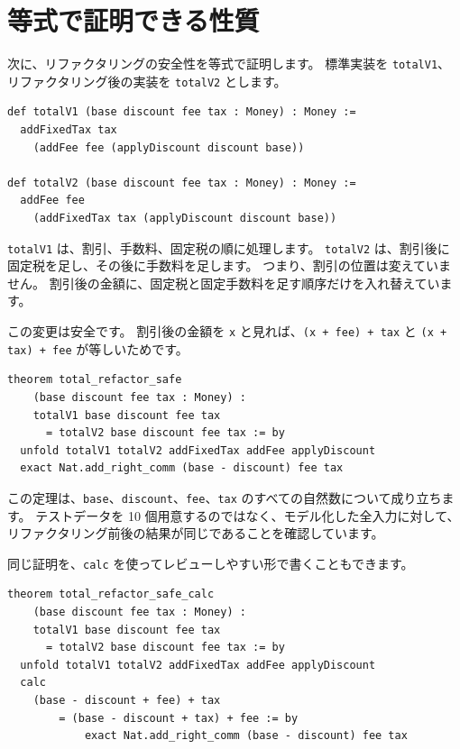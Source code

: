 \section{等式で証明できる性質}

次に、リファクタリングの安全性を等式で証明します。
標準実装を \texttt{totalV1}、リファクタリング後の実装を \texttt{totalV2} とします。

\begin{listing}[htbp]
\begin{verbatim}
def totalV1 (base discount fee tax : Money) : Money :=
  addFixedTax tax
    (addFee fee (applyDiscount discount base))

def totalV2 (base discount fee tax : Money) : Money :=
  addFee fee
    (addFixedTax tax (applyDiscount discount base))
\end{verbatim}
\caption{\texttt{totalV1} と \texttt{totalV2}}
\label{lst:ch26-total-v1-v2}
\end{listing}

\texttt{totalV1} は、割引、手数料、固定税の順に処理します。
\texttt{totalV2} は、割引後に固定税を足し、その後に手数料を足します。
つまり、割引の位置は変えていません。
割引後の金額に、固定税と固定手数料を足す順序だけを入れ替えています。

この変更は安全です。
割引後の金額を \texttt{x} と見れば、\texttt{(x + fee) + tax} と \texttt{(x + tax) + fee} が等しいためです。

\begin{listing}[htbp]
\begin{verbatim}
theorem total_refactor_safe
    (base discount fee tax : Money) :
    totalV1 base discount fee tax
      = totalV2 base discount fee tax := by
  unfold totalV1 totalV2 addFixedTax addFee applyDiscount
  exact Nat.add_right_comm (base - discount) fee tax
\end{verbatim}
\caption{\texttt{total\_refactor\_safe}}
\label{lst:ch26-total-refactor-safe}
\end{listing}

この定理は、\texttt{base}、\texttt{discount}、\texttt{fee}、\texttt{tax} のすべての自然数について成り立ちます。
テストデータを 10 個用意するのではなく、モデル化した全入力に対して、リファクタリング前後の結果が同じであることを確認しています。

同じ証明を、\texttt{calc} を使ってレビューしやすい形で書くこともできます。

\begin{listing}[htbp]
\begin{verbatim}
theorem total_refactor_safe_calc
    (base discount fee tax : Money) :
    totalV1 base discount fee tax
      = totalV2 base discount fee tax := by
  unfold totalV1 totalV2 addFixedTax addFee applyDiscount
  calc
    (base - discount + fee) + tax
        = (base - discount + tax) + fee := by
            exact Nat.add_right_comm (base - discount) fee tax
\end{verbatim}
\caption{\texttt{total\_refactor\_safe\_calc}}
\label{lst:ch26-total-refactor-calc}
\end{listing}

